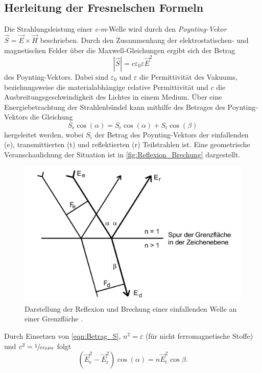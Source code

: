 \subsection{Herleitung der Fresnelschen Formeln}
\label{subsec:T_Fresnel}
Die Strahlungsleistung einer \textit{e-m}-Welle wird durch den \textit{Poynting-Vekor} $\vec{S} = \vec{E} \times \vec{H}$ beschrieben. Durch den Zusammenhang der 
elektrostatischen- und magnetischen Felder über die Maxwell-Gleichungen ergibt sich der Betrag
\begin{equation}
    \label{eqn:Betrag_S}
    |\vec{S}| = c \varepsilon_0 \varepsilon \vec{E}^2
\end{equation}
des Poynting-Vektors. Dabei sind $\varepsilon_0$ und $\varepsilon$ die Permittivität des Vakuums, beziehungsweise die materialabhängige relative Permittivität und $c$ die 
Ausbreitungsgeschwindigkeit des Lichtes in einem Medium.    
Über eine Energiebetrachtung der Strahlenbündel kann mithilfe des Betrages des Poynting-Vektors die Gleichung
\begin{equation*}
    S_\text{e} \cos(\alpha) = S_\text{r} \cos(\alpha) + S_\text{t} \cos(\beta)
\end{equation*}
hergeleitet werden, wobei $S_i$ der Betrag des Poynting-Vektors der einfallenden (e), transmittierten (t) und reflektierten (r) Teilstrahlen ist.
Eine geometrische Veranschaulichung der Situation ist in \autoref{fig:Reflexion_Brechung} dargestellt.
\begin{figure}
    \centering
    \includegraphics[width = .65\textwidth]{content/Reflexion_Brechung.png}
    \caption{Darstellung der Reflexion und Brechung einer einfallenden Welle an einer Grenzfläche \cite{v407}.}
    \label{fig:Reflexion_Brechung}
\end{figure}
Durch Einsetzen von \eqref{eqn:Betrag_S}, $n^2 = \varepsilon$ (für nicht ferromagnetische Stoffe) und $c^2 = \sfrac{1}{\varepsilon \varepsilon_0 \mu_0}$ folgt
\begin{equation*}
    \left(\vec{E}_\text{e}^2 - \vec{E}_\text{r}^2\right) \cos(\alpha) = n \vec{E}_\text{t}^2 \cos{\beta}.
\end{equation*}
